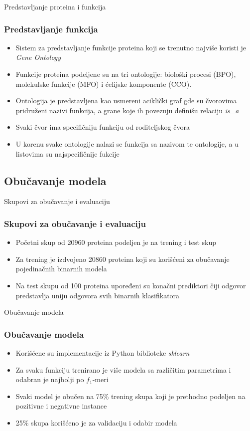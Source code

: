 \documentclass{beamer}
\begin{document}
\begin{frame}{Predstavljanje proteina i funkcija}
	\frametitle{Predstavljanje funkcija}
	\begin{itemize}
		\item Sistem za predstavljanje funkcije proteina koji se
		trenutno najviše koristi je \textit{Gene Ontology}
		
		\item Funkcije proteina podeljene su na tri
		ontologije: biološki procesi (BPO), molekulske funkcije (MFO) i ćelijske komponente (CCO).
		
		\item Ontologija je predstavljena kao usmereni aciklički graf gde su čvorovima pridruženi nazivi funkcija, a grane koje ih povezuju definišu relaciju \textit{is\_a}
		
		\item Svaki čvor ima specifičniju funkciju od roditeljskog čvora
	
		\item U korenu svake ontologije nalazi se funkcija sa nazivom te ontologije, a u listovima su najspecifičnije fukcije
	\end{itemize}
\end{frame}


\subsection{Obučavanje modela}
\begin{frame}{Skupovi za obučavanje i evaluaciju}
	\frametitle{Skupovi za obučavanje i evaluaciju}
	\begin{itemize}
		\item Početni skup od 20960 proteina podeljen je na trening i test skup
		
		\item Za trening je izdvojeno 20860 proteina koji su korišćeni za obučavanje pojedinačnih binarnih modela
		
		\item Na test skupu od 100 proteina upoređeni su konačni prediktori čiji odgovor predstavlja uniju odgovora svih binarnih klasifikatora 
	\end{itemize}
\end{frame}


\begin{frame}{Obučavanje modela}
	\frametitle{Obučavanje modela}
	\begin{itemize}
		\item Korišćene su implementacije iz Python biblioteke \textit{sklearn}
		
		\item Za svaku funkciju trenirano je više modela sa različitim parametrima i odabran je najbolji po $f_1$-meri 
		
		\item Svaki model je obučen na 75\% trening skupa koji je prethodno podeljen na pozitivne i negativne instance
		
		\item 25\% skupa korišćeno je za validaciju i odabir modela 
		 
	\end{itemize}
\end{frame}
\end{document}
